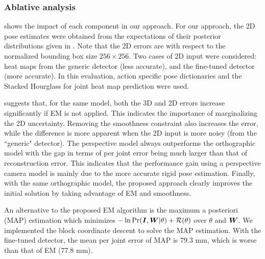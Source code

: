 \subsubsection{Ablative analysis}

 shows the impact of each component in our approach. For our approach, the 2D pose estimates were obtained from the expectations of their posterior distributions given in . Note that the 2D errors are with respect to the normalized bounding box size $256\times256$. Two cases of 2D input were considered: heat maps from the generic detector (less accurate), and the fine-tuned detector (more accurate).  In this evaluation, action specific pose dictionaries and the Stacked Hourglass for joint heat map prediction were used.%

 suggests that, for the same model, both the 3D and 2D errors increase significantly if EM is not applied.  This indicates the importance of marginalizing the 2D uncertainty. Removing the smoothness constraint also increases the error, while the difference is more apparent when the 2D input is more noisy (from the ``generic" detector). The perspective model always outperforms the orthographic model %
with the gap in terms of per joint error being much larger than that of reconstruction error.  This indicates that the performance gain using a perspective camera model is mainly due to the more accurate rigid pose estimation. Finally, with the same orthographic model, the proposed approach clearly improves the initial solution \cite{zhou2015sparse} by taking advantage of EM and smoothness.

An alternative to the proposed EM algorithm is the maximum a posteriori (MAP) estimation which minimizes $-\ln\mbox{Pr}({\bm{I}},{\bm{W}}|\theta)+\mathcal{R}(\theta)$ over $\theta$ and ${\bm{W}}$. We implemented the block coordinate descent to solve the MAP estimation. With the fine-tuned detector, the mean per joint error of MAP is 79.3 mm, which is worse than that of EM (77.8 mm).


